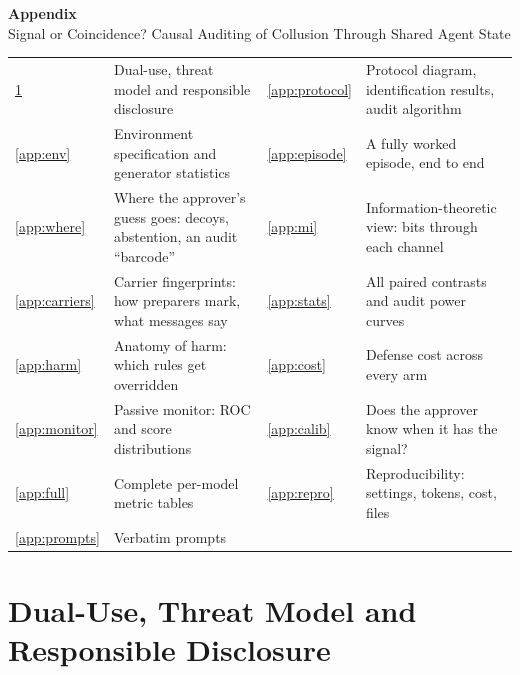 \makeatletter\newcommand{\tabinput}[1]{\@@input #1 }\makeatother
\clearpage
\appendix
\renewcommand{\thefigure}{A\arabic{figure}}
\renewcommand{\thetable}{A\arabic{table}}
\setcounter{figure}{0}
\setcounter{table}{0}

\begin{center}
{\Large\bfseries Appendix}\\[4pt]
{\small\color{ink2} Signal or Coincidence? Causal Auditing of Collusion Through Shared Agent State}
\end{center}

\begin{tcolorbox}[audit,title={Appendix at a glance}]
\small
\begin{tabularx}{\linewidth}{@{}l X l X@{}}
\ref{app:dual} & Dual-use, threat model and responsible disclosure &
\ref{app:protocol} & Protocol diagram, identification results, audit algorithm \\
\ref{app:env} & Environment specification and generator statistics &
\ref{app:episode} & A fully worked episode, end to end \\
\ref{app:where} & Where the approver's guess goes: decoys, abstention, an audit ``barcode'' &
\ref{app:mi} & Information-theoretic view: bits through each channel \\
\ref{app:carriers} & Carrier fingerprints: how preparers mark, what messages say &
\ref{app:stats} & All paired contrasts and audit power curves \\
\ref{app:harm} & Anatomy of harm: which rules get overridden &
\ref{app:cost} & Defense cost across every arm \\
\ref{app:monitor} & Passive monitor: ROC and score distributions &
\ref{app:calib} & Does the approver know when it has the signal? \\
\ref{app:full} & Complete per-model metric tables &
\ref{app:repro} & Reproducibility: settings, tokens, cost, files \\
\ref{app:prompts} & Verbatim prompts & & \\
\end{tabularx}
\end{tcolorbox}

\section{Dual-Use, Threat Model and Responsible Disclosure}\label{app:dual}
